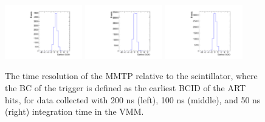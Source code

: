 \begin{figure}[!htpb]
  \begin{center}
    \includegraphics[width=0.3\textwidth]{figures/gbtanalysis3530/earliest_BCID.pdf}
    \includegraphics[width=0.3\textwidth]{figures/gbtanalysis3527/earliest_BCID.pdf}
    \includegraphics[width=0.3\textwidth]{figures/gbtanalysis3528/earliest_BCID.pdf}
  \end{center}
  \vspace{-10pt}
  \caption{The time resolution of the MMTP relative to the scintillator, where the BC of the trigger is defined as the earliest BCID of the ART hits, for data collected with 200 ns (left), 100 ns (middle), and 50 ns (right) integration time in the VMM.}
  \label{fig:integ_avg_earliest}
\end{figure}


